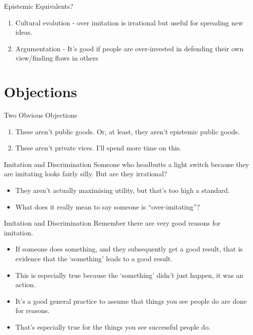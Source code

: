 \documentclass[
  ignorenonframetext,
]{beamer}
\providecommand{\tightlist}{%
  \setlength{\itemsep}{0pt}\setlength{\parskip}{0pt}}
\begin{document}
\begin{frame}{Epistemic Equivalents?}
\protect\hypertarget{epistemic-equivalents}{}
\begin{enumerate}[<+->]
\tightlist
\item
  Cultural evolution - over imitation is irrational but useful for
  spreading new ideas.
\item
  Argumentation - It's good if people are over-invested in defending
  their own view/finding flaws in others
\end{enumerate}
\end{frame}

\hypertarget{objections}{%
\section{Objections}\label{objections}}

\begin{frame}{Two Obvious Objections}
\protect\hypertarget{two-obvious-objections}{}
\begin{enumerate}[<+->]
\tightlist
\item
  These aren't public goods. Or, at least, they aren't epistemic public
  goods.
\item
  These aren't private vices. I'll spend more time on this.
\end{enumerate}
\end{frame}

\begin{frame}{Imitation and Discrimination}
\protect\hypertarget{imitation-and-discrimination}{}
Someone who headbutts a light switch because they are imitating looks
fairly silly. But are they irrational?

\begin{itemize}
\tightlist
\item
  They aren't actually maximising utility, but that's too high a
  standard.
\item
  What does it really mean to say someone is ``over-imitating''?
\end{itemize}
\end{frame}

\begin{frame}{Imitation and Discrimination}
\protect\hypertarget{imitation-and-discrimination-1}{}
Remember there are very good reasons for imitation.

\begin{itemize}
\tightlist
\item
  If someone does something, and they subsequently get a good result,
  that is evidence that the `something' leads to a good result.
\item
  This is especially true because the `something' didn't just happen, it
  was an action.
\item
  It's a good general practice to assume that things you see people do
  are done for reasons.
\item
  That's especially true for the things you see successful people do.
\end{itemize}
\end{frame}
\end{document}
